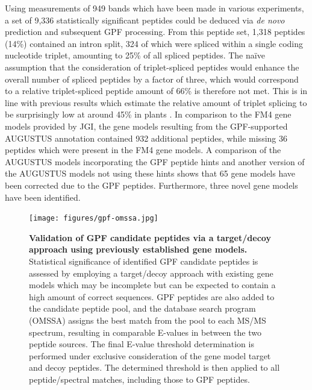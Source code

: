 Using measurements of 949 bands which have been made in various experiments,
a set of 9,336 statistically significant peptides could be deduced via 
{\em de novo} prediction and subsequent GPF processing.
From this peptide set, 1,318 peptides (14\%) contained an intron split,
324 of which were spliced within a single coding nucleotide triplet,
amounting to 25\% of all spliced peptides.
The na\"ive assumption that the consideration of triplet-spliced peptides
would enhance the overall number of spliced peptides by a factor of three,
which would correspond to a relative triplet-spliced peptide amount of 66\%
is therefore not met.
This is in line with previous results which estimate the relative amount
of triplet splicing to be surprisingly low at around 45\% in plants 
\citep{Tomita1996}.
In comparison to the FM4 gene models provided by JGI, the gene models 
resulting from the GPF-supported AUGUSTUS annotation contained 932 additional
peptides, while missing 36 peptides which were present in the FM4 gene models.
A comparison of the AUGUSTUS models incorporating the GPF peptide hints
and another version of the AUGUSTUS models not using these hints shows that
65 gene models have been corrected due to the GPF peptides.
Furthermore, three novel gene models have been identified.

\begin{figure}
\texttt{[image: figures/gpf-omssa.jpg]}
\caption{
{\bf Validation of GPF candidate peptides via a target/decoy approach
    using previously established gene models.} 
    Statistical significance of identified GPF candidate peptides is 
    assessed by employing a target/decoy approach with existing gene models 
    which may be incomplete but can be expected to contain a high amount of 
    correct sequences.
    GPF peptides are also added to the candidate peptide pool, and the database
    search program (OMSSA) assigns the best match from the pool to each
    MS/MS spectrum, resulting in comparable E-values in between the two
    peptide sources.
    The final E-value threshold determination is performed under exclusive
    consideration of the gene model target and decoy peptides.
    The determined threshold is then applied to all peptide/spectral matches,
    including those to GPF peptides.
}
\label{fig:gpf-omssa}
\end{figure}

